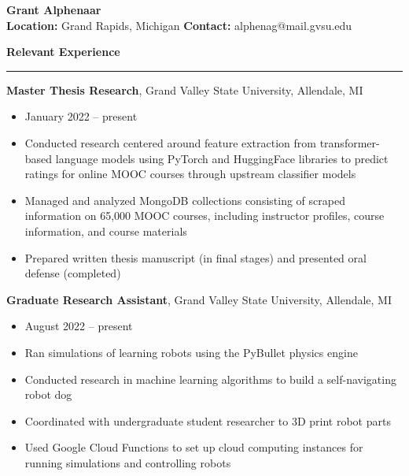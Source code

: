 \documentclass[a4paper, 11pt]{article}
\begin{document}
    \pagestyle{empty}
    \raggedright

    \begin{center}
      \huge\textbf{Grant Alphenaar}\\
      \vspace{.5em}
      \normalsize\textbf{Location:} Grand Rapids, Michigan \hspace{2em} \textbf{Contact:} alphenag@mail.gvsu.edu

    \end{center}

    \vspace{1em}

    {\noindent\large\textbf{Relevant Experience}\par}\vspace{.1em}
    \hrule
    \vspace{1em}

      \textbf{Master Thesis Research}, Grand Valley State University, Allendale, MI
      \begin{itemize}
        \item January 2022 -- present
        \item Conducted research centered around feature extraction from transformer-based language models using PyTorch and HuggingFace libraries to predict ratings for online MOOC courses through upstream classifier models
        \item Managed and analyzed MongoDB collections consisting of scraped information on 65,000 MOOC courses, including instructor profiles, course information, and course materials
        \item Prepared written thesis manuscript (in final stages) and presented oral defense (completed)
      \end{itemize}

      \textbf{Graduate Research Assistant}, Grand Valley State University, Allendale, MI
      \begin{itemize}
        \item August 2022 -- present
        \item Ran simulations of learning robots using the PyBullet physics engine
        \item Conducted research in machine learning algorithms to build a self-navigating robot dog
        \item Coordinated with undergraduate student researcher to 3D print robot parts
        \item Used Google Cloud Functions to set up cloud computing instances for running simulations and controlling robots
      \end{itemize}
\end{document}
